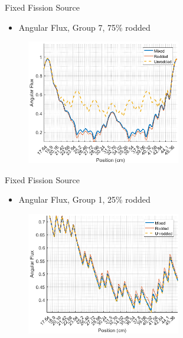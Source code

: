 
\begin{frame}[t]{Fixed Fission Source}

\begin{itemize}
  \item Angular Flux, Group 7, 75\% rodded
\end{itemize}
\begin{figure}[H]
  \centering
  \includegraphics[width=0.6\textwidth]{../figs/1dmoc-75mix-angflux7.png}
\end{figure}

\end{frame}


\begin{frame}[t]{Fixed Fission Source}

\begin{itemize}
  \item Angular Flux, Group 1, 25\% rodded
\end{itemize}
\begin{figure}[H]
  \centering
  \includegraphics[width=0.6\textwidth]{../figs/1dmoc-25mix-angflux1.png}
\end{figure}

\end{frame}


